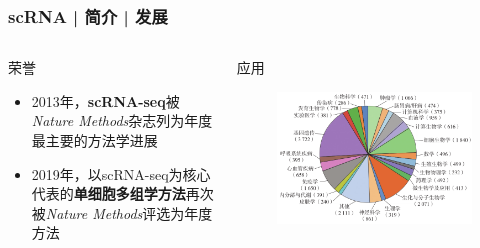 \documentclass[11pt]{ctexbeamer}
\begin{document}
\begin{frame}
  \frametitle{scRNA | 简介 |  发展}
      \begin{columns}
  \begin{block}{荣誉}
  \begin{itemize}
    \item 2013年，\textbf{scRNA-seq}被\textit{Nature Methods}杂志列为年度最主要的方法学进展
    \item 2019年，以scRNA-seq为核心代表的\textbf{单细胞多组学方法}再次被\textit{Nature Methods}评选为年度方法
  \end{itemize}
  \end{block}
  \begin{block}{应用}
   \begin{figure}
    \centering
    \includegraphics[width=\textwidth]{scRNA_application_01.png}
  \end{figure}
  \end{block}
  \end{columns}
\end{frame}
\end{document}
